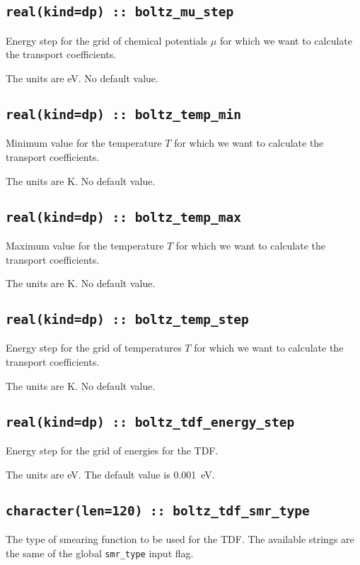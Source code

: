 \subsection[boltz\_mu\_step]{\tt real(kind=dp) :: boltz\_mu\_step}
Energy step for the grid of chemical potentials $\mu$ for which we want to calculate the transport coefficients.

The units are eV.
No default value.

\subsection[boltz\_temp\_min]{\tt real(kind=dp) :: boltz\_temp\_min}
Minimum value for the temperature $T$ for which we want to calculate the transport coefficients.

The units are K.
No default value.

\subsection[boltz\_temp\_max]{\tt real(kind=dp) :: boltz\_temp\_max}
Maximum value for the temperature $T$ for which we want to calculate the transport coefficients.

The units are K.
No default value.

\subsection[boltz\_temp\_step]{\tt real(kind=dp) :: boltz\_temp\_step}
Energy step for the grid of temperatures $T$ for which we want to calculate the transport coefficients.

The units are K.
No default value.

\subsection[boltz\_tdf\_energy\_step]{\tt real(kind=dp) :: boltz\_tdf\_energy\_step}
Energy step for the grid of energies for the TDF.

The units are eV.
The default value is 0.001~eV.

\subsection[boltz\_tdf\_smr\_type]{\tt character(len=120) :: boltz\_tdf\_smr\_type}
The type of smearing function to be used for the TDF. The available strings are the same of the global {\tt smr\_type} input flag. 

